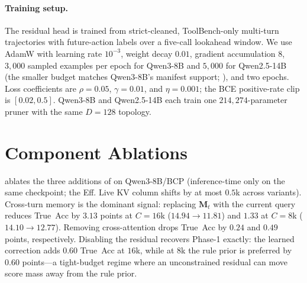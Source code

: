 \documentclass[11pt]{article}
\newcommand{\phaseone}{Phase-1\xspace}
\begin{document}
\paragraph{Training setup.}
The residual head is trained from strict-cleaned, ToolBench-only
multi-turn trajectories with future-action labels over a five-call
lookahead window. We use AdamW with learning rate $10^{-3}$, weight
decay $0.01$, gradient accumulation $8$, $3{,}000$ sampled examples
per epoch for Qwen3-8B and $5{,}000$ for Qwen2.5-14B (the smaller
budget matches Qwen3-8B's manifest support; ),
and two epochs. Loss coefficients
are $\rho=0.05$, $\gamma=0.01$, and $\eta=0.001$; the BCE positive-rate
clip is $[0.02,0.5]$. Qwen3-8B and Qwen2.5-14B each train one
$214{,}274$-parameter pruner with the same $D{=}128$ topology.

\section{Component Ablations}
\label{appendix:component-ablation}

 ablates the three additions of
 on Qwen3-8B/BCP (inference-time only on the same
checkpoint; the Eff. Live KV column shifts by at most $0.5$k across
variants). Cross-turn memory is the dominant signal: replacing
$\mathbf{M}_t$ with the current query reduces True~Acc by $3.13$
points at $C{=}16$k ($14.94\!\to\!11.81$) and $1.33$ at $C{=}8$k
($14.10\!\to\!12.77$). Removing cross-attention drops True~Acc by
$0.24$ and $0.49$ points, respectively. Disabling the residual
recovers \phaseone exactly: the learned correction adds $0.60$
True~Acc at $16$k, while at $8$k the rule prior is preferred by
$0.60$ points---a tight-budget regime where an unconstrained
residual can move score mass away from the rule prior.
\end{document}
